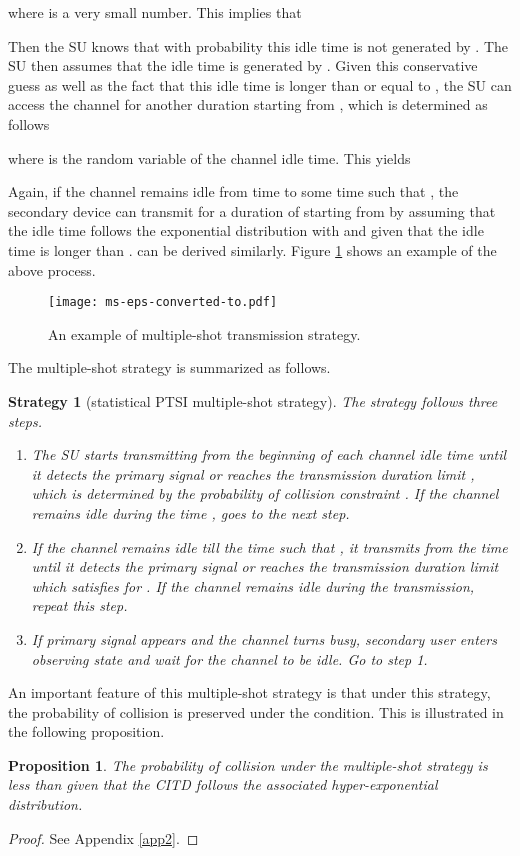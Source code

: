 \documentclass[10pt,final,journal,letterpaper]{IEEEtran}
\newtheorem{proposition}{Proposition}
\newtheorem{strategy}{Strategy}
\begin{document}
where  is a very small number. This implies that

Then the SU knows that with probability  this idle time is not generated by . The SU then assumes that the idle time is generated by . Given this conservative guess as well as the fact that this idle time is longer than or equal to , the SU can access the channel for another duration  starting from , which is determined as follows

where  is the random variable of the channel idle time. This yields

Again, if the channel remains idle from time  to some time  such that , the secondary device can transmit for a duration of  starting from  by assuming that the idle time follows the exponential distribution with  and given that the idle time is longer than .  can be derived similarly. Figure \ref{fig:ms} shows an example of the above process.
\begin{figure}[!t]
\centering
\texttt{[image: ms-eps-converted-to.pdf]}
\caption{An example of multiple-shot transmission strategy.}
\label{fig:ms}
\end{figure}

\par
The multiple-shot strategy is summarized as follows.
\begin{strategy}[statistical PTSI multiple-shot strategy]
The strategy follows three steps.
\begin{enumerate}
  \item The SU starts transmitting from the beginning of each channel idle time  until it detects the primary signal or reaches the transmission duration limit , which is determined by the probability of collision constraint . If the channel remains idle during the time , goes to the next step.
  \item If the channel remains idle till the time  such that , it transmits from the time  until it detects the primary signal or reaches the transmission duration limit   which satisfies  for . If the channel remains idle during the transmission, repeat this step.
  \item If primary signal appears and the channel turns busy, secondary user enters observing state and wait for the channel to be idle. Go to step 1.
\end{enumerate}
\end{strategy}

\par
An important feature of this multiple-shot strategy is that under this strategy, the probability of collision  is preserved under the  condition. This is illustrated in the following proposition.
\begin{proposition}\label{sec4prop1}
The probability of collision under the multiple-shot strategy is less than  given that the CITD follows the associated hyper-exponential distribution.
\end{proposition}
\begin{proof}
See Appendix \ref{app2}.
\end{proof}
\end{document}
